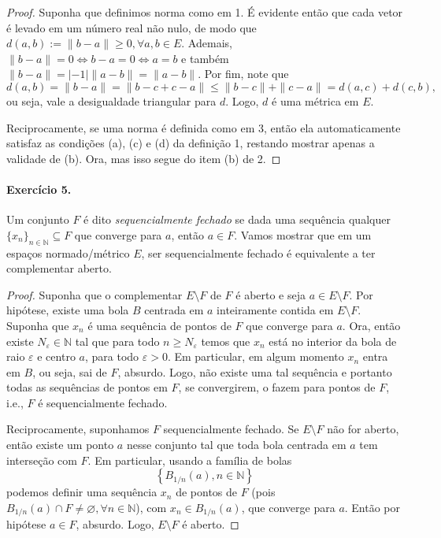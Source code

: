 \documentclass[12pt,a4paper]{article}
\begin{document}
\begin{proof}
Suponha que definimos norma como em 1. É evidente então que cada vetor é levado em um número real não nulo, 
de modo que $d(a,b) := \|b-a\| \geq 0, \forall a,b\in E$. Ademais, $\|b-a\| = 0 \iff b- a = 0 \iff a = b$ 
e também $\|b-a\| = |-1|\|a-b\| = \|a-b\|$. Por fim, note que
\begin{equation*}
    d(a,b) = \|b-a\| = \|b-c+c-a\| \leq \|b-c\| + \|c-a\| = d(a,c) + d(c,b),
\end{equation*}
ou seja, vale a desigualdade triangular para $d$. Logo, $d$ é uma métrica em $E$.

Reciprocamente, se uma norma é definida como em 3, então ela automaticamente satisfaz as condições (a), (c) e (d) da definição 1, 
restando mostrar apenas a validade de (b). Ora, mas isso segue do item (b) de 2.
\end{proof}

\paragraph{Exercício 5.} Um conjunto $F$ é dito \textit{sequencialmente fechado} se dada uma sequência qualquer
$\{x_n\}_{n\in\mathbb{N}} \subseteq F$ que converge para $a$, então $a\in F$. Vamos mostrar que em um espaços normado/métrico $E$,
ser sequencialmente fechado é equivalente a ter complementar aberto.

\begin{proof}
Suponha que o complementar $E\setminus F$ de $F$ é aberto e seja $a\in E\setminus F$. Por hipótese, existe uma bola $B$ centrada em
$a$ inteiramente contida em $E\setminus F$. Suponha que $x_n$ é uma sequência de pontos de $F$ que converge para $a$. 
Ora, então existe $N_{\varepsilon} \in \mathbb{N}$  tal que para todo $n\geq N_{\varepsilon}$ temos que $x_n$ está no 
interior da bola de raio $\varepsilon$ e centro $a$, para todo $\varepsilon > 0$. Em particular, em algum momento $x_n$ entra em $B$,
ou seja, sai de $F$, absurdo. Logo, não existe uma tal sequência e portanto todas as sequências de pontos em $F$, se convergirem,
o fazem para pontos de $F$, i.e., $F$ é sequencialmente fechado.

Reciprocamente, suponhamos $F$ sequencialmente fechado. Se $E\setminus F$ não for aberto, então existe um ponto $a$ nesse conjunto
tal que toda bola centrada em $a$ tem interseção com $F$. Em particular, usando a família de bolas
\begin{equation*}
    \left\{ B_{1/n}(a), n\in\mathbb{N} \right\}
\end{equation*}
podemos definir uma sequência $x_n$ de pontos de $F$ (pois $B_{1/n}(a) \cap F \neq \varnothing, \forall n\in\mathbb{N}$), 
com $x_n\in B_{1/n}(a)$, que converge para $a$. Então por hipótese $a\in F$, absurdo. Logo, $E\setminus F$ é aberto.
\end{proof}
\end{document}
